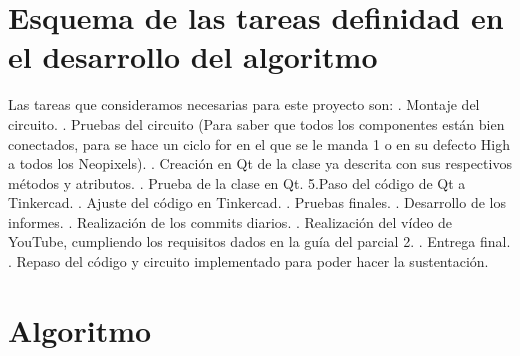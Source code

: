 \documentclass{article}
\begin{document}
\section{Esquema de las tareas definidad en el desarrollo del algoritmo}
Las tareas que consideramos necesarias para este proyecto son:
. Montaje del circuito.
. Pruebas del circuito (Para saber que todos los componentes están bien conectados, para se hace un ciclo for en el que se le manda 1 o en su defecto High a todos los Neopixels).
. Creación en Qt de la clase ya descrita con sus respectivos métodos y atributos.
. Prueba de la clase en Qt.
\newline
5.Paso del código de Qt a Tinkercad.
. Ajuste del código en Tinkercad.
. Pruebas finales.
. Desarrollo de los informes.
. Realización de los commits diarios. 
. Realización del vídeo de YouTube, cumpliendo los requisitos dados en la guía del parcial 2. 
. Entrega final.
. Repaso del código y circuito implementado para poder hacer la sustentación.


\newpage
  \section{Algoritmo}
  
\end{document}
